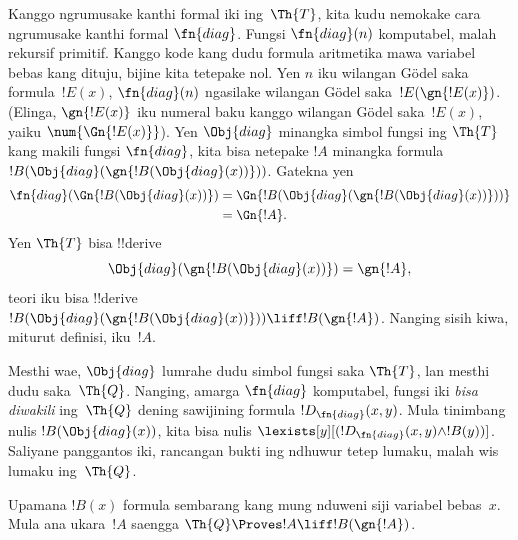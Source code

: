 \documentclass[../../../include/open-logic-section]{subfiles}
\begin{document}
\begin{explain}
Kanggo ngrumusake kanthi formal iki ing~$\Th{T}$, kita kudu nemokake cara
ngrumusake kanthi formal $\fn{diag}$. Fungsi $\fn{diag}(n)$ komputabel, malah
rekursif primitif. Kanggo kode kang dudu formula aritmetika mawa variabel bebas kang dituju, bijine kita tetepake nol. Yen $n$ iku wilangan G\"odel saka
formula~$!E(x)$, $\fn{diag}(n)$ ngasilake wilangan G\"odel
saka~$!E(\gn{!E(x)})$. (Elinga, $\gn{!E(x)}$ iku numeral baku kanggo
wilangan G\"odel saka~$!E(x)$, yaiku $\num{\Gn{!E(x)}}$). Yen
$\Obj{diag}$ minangka simbol fungsi ing $\Th{T}$ kang makili
fungsi $\fn{diag}$, kita bisa netepake $!A$ minangka formula
$!B(\Obj{diag}(\gn{!B(\Obj{diag}(x))}))$. Gatekna yen
\begin{align*}
\fn{diag}(\Gn{!B(\Obj{diag}(x))}) & = 
\Gn{!B(\Obj{diag}(\gn{!B(\Obj{diag}(x))}))} \\
& = \Gn{!A}.
\end{align*}
Yen $\Th{T}$ bisa !!{derive}
\[
\Obj{diag}(\gn{!B(\Obj{diag}(x))}) = \gn{!A},
\]
teori iku bisa !!{derive} $!B(\Obj{diag}(\gn{!B(\Obj{diag}(x))}))
\liff !B(\gn{!A})$. Nanging sisih kiwa, miturut
definisi, iku~$!A$.

Mesthi wae, $\Obj{diag}$ lumrahe dudu simbol fungsi saka
$\Th{T}$, lan mesthi dudu saka~$\Th{Q}$. Nanging, amarga $\fn{diag}$
komputabel, fungsi iki \emph{bisa diwakili} ing~$\Th{Q}$
dening sawijining formula $!D_{\fn{diag}}(x,y)$. Mula tinimbang nulis
$!B(\Obj{diag}(x))$, kita bisa nulis
$\lexists[y][(!D_{\fn{diag}}(x,y) \land !B(y))]$. Saliyane panggantos
iki, rancangan bukti ing ndhuwur tetep lumaku, malah wis lumaku
ing~$\Th{Q}$.
\end{explain}

\begin{lem}
 Upamana $!B(x)$ formula sembarang kang mung
nduweni siji variabel bebas~$x$. Mula ana ukara~$!A$ saengga
$\Th{Q} \Proves !A \liff !B(\gn{!A})$.
\end{lem}
\end{document}
